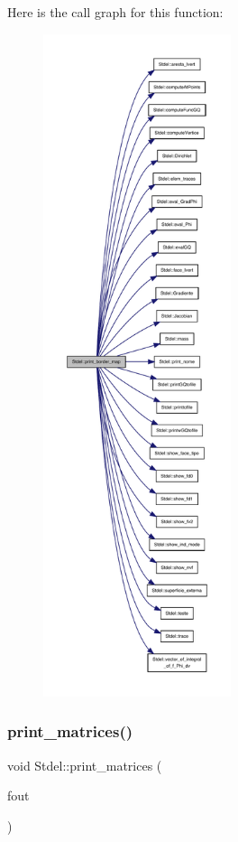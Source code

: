 Here is the call graph for this function\+:
\nopagebreak
\begin{figure}[H]
\begin{center}
\leavevmode
\includegraphics[height=550pt]{classStdel_a9a0c69dca7564f6ca4aa4f3c9864ea01_cgraph}
\end{center}
\end{figure}
\mbox{\label{classStdel_a319e6a16011b22e12028a841b7686f03}} 
\subsubsection{\texorpdfstring{print\+\_\+matrices()}{print\_matrices()}}
{\footnotesize\ttfamily void Stdel\+::print\+\_\+matrices (\begin{DoxyParamCaption}\item[{F\+I\+LE $\ast$}]{fout }\end{DoxyParamCaption})\hspace{0.3cm}{\ttfamily [inherited]}}



